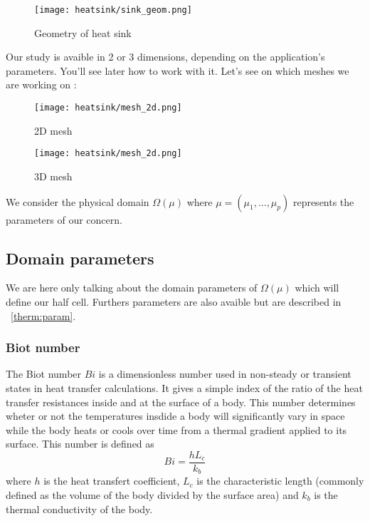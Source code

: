 \begin{figure}[!h]
\centering
\texttt{[image: heatsink/sink\_geom.png]}
\caption{Geometry of heat sink}
\end{figure}

Our study is avaible in 2 or 3 dimensions, depending on the application's parameters. You'll see later how to work with it. Let's see on which meshes we are working on :
\begin{figure}[!h]
\begin{minipage}[b]{.50\linewidth}
\centering
\texttt{[image: heatsink/mesh\_2d.png]}
\caption{2D mesh}
\end{minipage}
\begin{minipage}[b]{.50\linewidth}
\centering
\texttt{[image: heatsink/mesh\_2d.png]}
\caption{3D mesh}
\end{minipage}
\end{figure}

We consider the physical domain $\varOmega (\mu)$ where $\mu = (\mu_1, ...,\mu_p)$ represents the parameters of our concern. 

\subsection{Domain parameters}
We are here only talking about the domain parameters of $\varOmega(\mu)$ which will define our half cell. Furthers parameters are also avaible but are described in ~\ref{therm:param}.


\subsubsection{Biot number}
The Biot number $Bi$ is a dimensionless number used in non-steady or transient states in heat transfer calculations. It gives a simple index of the ratio of the heat transfer resistances inside  and at the surface of a body. This number determines wheter or not the temperatures insdide a body will significantly vary in space while the body heats or cools over time from a thermal gradient applied to its surface. This number is defined as 
\begin{equation}
Bi = \frac{hL_c}{k_b}
\end{equation} 
where $h$ is the heat transfert coefficient, $L_c$ is the characteristic length (commonly defined as the volume of the body divided by the surface area) and $k_b$ is the thermal conductivity of the body. 

